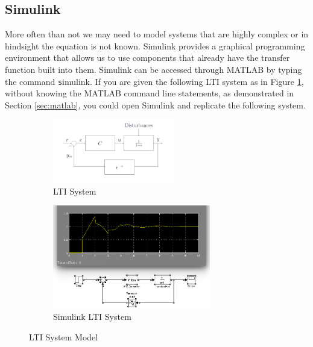 \documentclass[paper=letter, fontsize=11pt]{scrartcl}
\numberwithin{equation}{section}
\numberwithin{figure}{section}
\numberwithin{table}{section}
\begin{document}
\subsection{Simulink}
\label{sec:simulink}
\par
More often than not we may need to model systems that are highly complex or in
hindsight the equation is not known. Simulink provides a graphical programming
environment that allows us to use components that already have the transfer
function built into them. Simulink can be accessed through \ac{MATLAB} by typing
the command {\texttt simulink}. If you are given the following \ac{LTI} system
as in Figure \ref{fig:lti_system}, without knowing the \ac{MATLAB} command line
statements, as demonstrated in Section \ref{sec:matlab}, you could open Simulink
and replicate the following system.

\begin{figure}[h]
	\begin{subfigure}{.4\textwidth}
		\centering
	    \includegraphics[width=200px]{graphics/lti-system}
		\caption{\acs{LTI} System}
		\label{fig:lti_system}
	\end{subfigure}
	\begin{subfigure}{.6\textwidth}
		\centering
	    \includegraphics[width=260px]{graphics/simulink-lti}
		\caption{Simulink \acs{LTI} System}
		\label{fig:simulink_lti}
	\end{subfigure}
	\caption{\ac{LTI} System Model}
	\label{fig:lti_system_model}
\end{figure}

\end{document}
